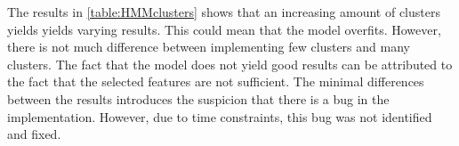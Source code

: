The results in \ref{table:HMMclusters} shows that an increasing amount of clusters yields yields varying results. This could mean that the model overfits. However, there is not much difference between implementing few clusters and many clusters. The fact that the model does not yield good results can be attributed to the fact that the selected features are not sufficient. The minimal differences between the results introduces the suspicion that there is a bug in the implementation. However, due to time constraints, this bug was not identified and fixed.

\begin{comment}
\subsection*{Amount of clusters}
Different amounts of clusters were used to test their effect on the model. The results are displayed in \ref{table:HMMclusters}. This was tested on three classes. As stated before, the transitions between neutral and negative are more prominent, which will show the effect of the amount of clusters.

\begin{table}[h!]
\begin{center}
\begin{tabular}{| c | c | c | c | c | c | c |}
\hline
 {\textbf{Classes}} 	 
 & {\textbf{Data per class}} 					& {\textbf{Clusters}} 
 & {\textbf{Train Accuracy (\%)}} 					& {\textbf{Test Accuracy (\%)}} 
 \\
\hline
3 	 		& 500 		& 10			& 73.68		& 76.41		\\
3 	 		& 500 		& 20			& 73.71		& 76.38		\\
3 	 		& 500 		& 30			& 73.78		& 76.28		\\
3 	 		& 500 		& 40			& 74.11		& 75.88		\\
3 	 		& 500 		& 50			& 74.18		& 75.55		\\
\hline
\end{tabular}
\caption{HMM amount of clusters}
\label{table:HMMclusters}
\end{center}
\end{table}

The results in \ref{table:HMMclusters} shows that an increasing amount of clusters yields worse results as more are added. This could mean that the model overfits. However, there is not much difference between implementing few clusters and many clusters. The fact that the model does not yield good results can be attributed to the fact that the selected features are not sufficient. The minimal differences between the results confirms the suspicion that there is a bug in the implementation. However, due to time constraints, this bug was not identified and fixed. On the other hand, in each case, the test set performs better than the training set. This means that the model generalizes well, which is the goal of the implementation of any model.
\end{comment}